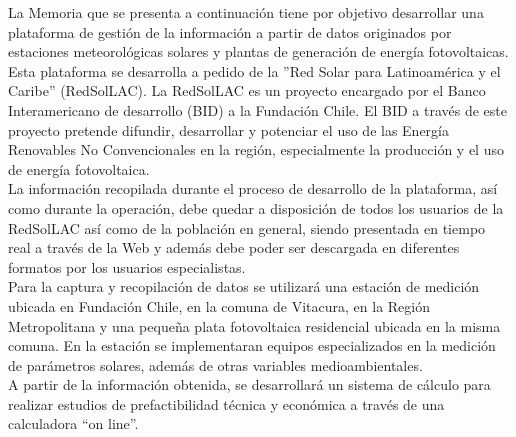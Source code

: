 La Memoria que se presenta a continuación tiene por objetivo desarrollar una plataforma de gestión de la información a partir de datos originados por estaciones meteorológicas solares y plantas de generación de energía fotovoltaicas. Esta plataforma se desarrolla a pedido de la ''Red Solar para Latinoamérica y el Caribe'' (RedSolLAC). La RedSolLAC es un proyecto encargado por el Banco Interamericano de desarrollo (BID) a la Fundación Chile. El BID a través de este proyecto pretende difundir, desarrollar y potenciar el uso de las Energía Renovables No Convencionales en la región, especialmente la producción y el uso de energía fotovoltaica.\\

La información recopilada durante el proceso de desarrollo de la plataforma, así como durante la operación, debe quedar a disposición de todos los usuarios de la RedSolLAC así como de la población en general, siendo presentada en tiempo real a través de la Web y además debe poder ser descargada en diferentes formatos por los usuarios especialistas.\\

Para la captura y recopilación de datos se utilizará una estación de medición ubicada en Fundación Chile, en la comuna de Vitacura, en la Región Metropolitana y una pequeña plata fotovoltaica residencial ubicada en la misma comuna. En la estación se implementaran equipos especializados en la medición de parámetros solares, además de otras variables medioambientales.\\

A partir de la información obtenida, se desarrollará un sistema de cálculo para realizar estudios de prefactibilidad técnica y económica a través de una calculadora “on line”.
